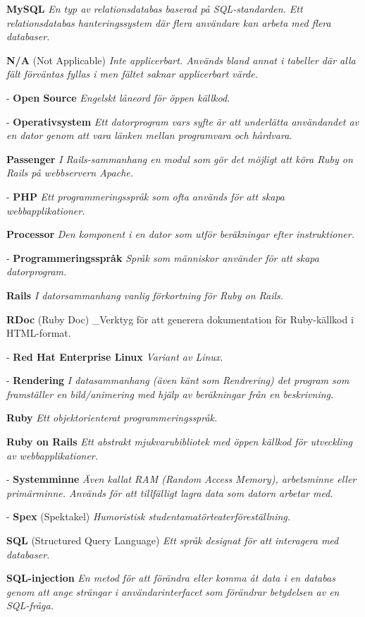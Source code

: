 \documentclass[a4paper, twoside, 11pt, titlepage]{article}
\begin{document}
\textbf{MySQL} \emph{En typ av relationsdatabas baserad på SQL-standarden. Ett relationsdatabas hanteringssystem där flera användare kan arbeta med flera databaser.}

\textbf{N/A} (Not Applicable) \emph{Inte applicerbart. Används bland annat i tabeller där alla fält förväntas fyllas i men fältet saknar applicerbart värde.}

- \textbf{Open Source} \emph{Engelskt låneord för öppen källkod.}

- \textbf{Operativsystem} \emph{Ett datorprogram vars syfte är att underlätta användandet av en dator genom att vara länken mellan programvara och hårdvara.}

\textbf{Passenger} \emph{I Rails-sammanhang en modul som gör det möjligt att köra Ruby on Rails på webbservern Apache.}

- \textbf{PHP} \emph{Ett programmeringsspråk som ofta används för att skapa webbapplikationer.}

\textbf{Processor} \emph{Den komponent i en dator som utför beräkningar efter instruktioner.}

- \textbf{Programmeringsspråk} \emph{Språk som människor använder för att skapa datorprogram.}

\textbf{Rails} \emph{I datorsammanhang vanlig förkortning för Ruby on Rails.}

\textbf{RDoc} (Ruby Doc) \_Verktyg för att generera dokumentation för Ruby-källkod i HTML-format.

- \textbf{Red Hat Enterprise Linux} \emph{Variant av Linux.}

- \textbf{Rendering} \emph{I datasammanhang (även känt som Rendrering) det program som framställer en bild/animering med hjälp av beräkningar från en beskrivning.}

\textbf{Ruby} \emph{Ett objektorienterat programmeringsspråk.}

\textbf{Ruby on Rails} \emph{Ett abstrakt mjukvarubibliotek med öppen källkod för utveckling av webbapplikationer.}

- \textbf{Systemminne} \emph{Även kallat RAM (Random Access Memory), arbetsminne eller primärminne. Används för att tillfälligt lagra data som datorn arbetar med.}

- \textbf{Spex} (Spektakel) \emph{Humoristisk studentamatörteaterföreställning.}

\textbf{SQL} (Structured Query Language) \emph{Ett språk designat för att interagera med databaser.}

\textbf{SQL-injection} \emph{En metod för att förändra eller komma åt data i en databas genom att ange strängar i användarinterfacet som förändrar betydelsen av en SQL-fråga.}
\end{document}
